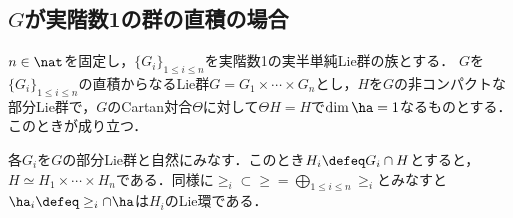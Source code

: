 \subsection{$G$が実階数1の群の直積の場合}

\begin{thm}\label{thm:0113-main}
  $n\in \nat$を固定し，$\{G_i \}_{1\leq i\leq n} $を実階数1の実半単純Lie群の族とする．
  $G$を$\{G_i \}_{1\leq i\leq n} $の直積からなるLie群$G = G_1\times \cdots \times G_n $とし，$H$を$G$の非コンパクトな部分Lie群で，$G$のCartan対合$\Theta$に対して$\Theta H = H$で$\dim \ha = 1$なるものとする．このときが成り立つ．
\end{thm}


\begin{pfwn}{}

  各$G_i $を$G$の部分Lie群と自然にみなす．このとき$H_i\defeq G_i\cap H$とすると，$H \simeq H_1\times\cdots  \times H_n  $である．同様に$\ge_i\subset \ge = \bigoplus_{1\leq i\leq n}\ge_i $とみなすと$\ha_i\defeq \ge_i\cap \ha $は$H_i$のLie環である．
  
\end{pfwn}
